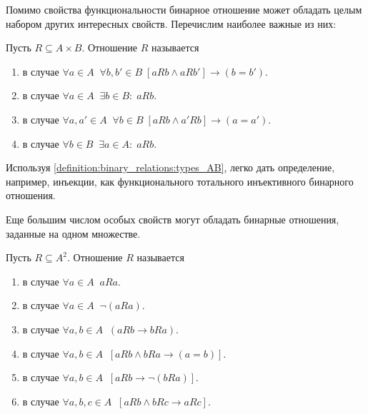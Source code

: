 Помимо свойства функциональности бинарное отношение может обладать целым набором других интересных свойств.
Перечислим наиболее важные из них:
\begin{definition}
    \label{definition:binary_relations:types_AB}
    Пусть $ R \subseteq A \times B $.
    Отношение $ R $ называется
    \begin{enumerate}
        \item {} в случае $ \forall a \in A \;\; \forall b, b' \in B \; \left[ a R b \wedge a R b' \right] \rightarrow (b = b') $.
        \item {} в случае $ \forall a \in A \;\; \exists b \in B: \; a R b $.
        \item {} в случае $ \forall a, a' \in A \;\; \forall b \in B \; \left[ a R b \wedge a' R b \right] \rightarrow (a = a') $.
        \item {} в случае $ \forall b \in B \;\; \exists a \in A: \; a R b $.
    \end{enumerate}
\end{definition}
Используя \ref{definition:binary_relations:types_AB}, легко дать определение, например, инъекции,
как функционального тотального инъективного бинарного отношения.

Еще большим числом особых свойств могут обладать бинарные отношения,
заданные на одном множестве.
\begin{definition}
    \label{definition:binary_relations:types_AA}
    Пусть $ R \subseteq A^2 $.
    Отношение $ R $ называется
    \begin{enumerate}
        \item {} в случае $ \forall a \in A \;\; a R a $.
        \item {} в случае $ \forall a \in A \;\; \neg (a R a) $.
        \item {} в случае $ \forall a, b \in A \;\; \left( a R b \rightarrow b R a \right) $.
        \item {} в случае $ \forall a, b \in A \;\; \left[ a R b \wedge b R a \rightarrow (a = b) \right] $.
        \item {} в случае $ \forall a, b \in A \;\; \left[ a R b \rightarrow \neg (b R a) \right] $.
        \item {} в случае $ \forall a, b, c \in A \;\; \left[ a R b \wedge b R c \rightarrow a R c \right] $.
    \end{enumerate}
\end{definition}

